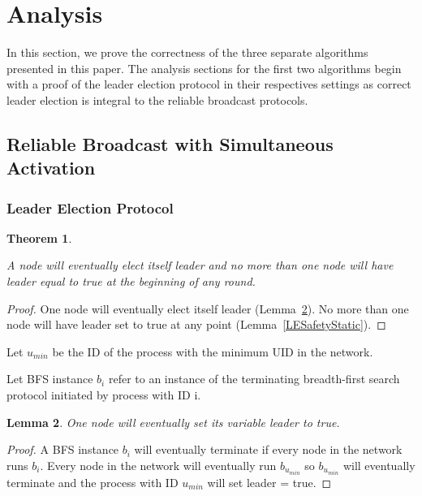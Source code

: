 \documentclass[english]{article}
\newtheorem{theorem}{Theorem}[section]
\newtheorem{lemma}[theorem]{Lemma}
\begin{document}
\section{Analysis}

In this section, we prove the correctness of the three separate algorithms presented in this paper. The analysis sections for the first two algorithms begin with a proof of the leader election protocol in their respectives settings as correct leader election is integral to the reliable broadcast protocols.

\subsection {Reliable Broadcast with Simultaneous Activation}

\subsubsection{Leader Election Protocol}

\begin{theorem}
\label{LeaderElectionStatic}

A node will eventually elect itself leader and no more than one node will have leader equal to true at the beginning of any round. 
\end{theorem}
\begin{proof}
One node will eventually elect itself leader (Lemma~\ref{LELivenessStatic}).
No more than one node will have leader set to true at any point (Lemma~\ref{LESafetyStatic}).
\end{proof}

\begin{definition}
Let $u_{min}$ be the ID of the process with the minimum UID in the network. 
\end{definition}

\begin{definition}
Let BFS instance $b_i$ refer to an instance of the terminating breadth-first search protocol initiated by process with ID i.
\end{definition}

\begin{lemma}
\label{LELivenessStatic}
  One node will eventually set its variable leader to true.
\end{lemma}
\begin{proof}
A BFS instance $b_i$ will eventually terminate if every node in the network runs $b_i$. 
Every node in the network will eventually run $b_{u_{min}}$ so $b_{u_{min}}$ will eventually terminate and the process with ID $u_{min}$ will set leader = true.
\end{proof}
\end{document}
